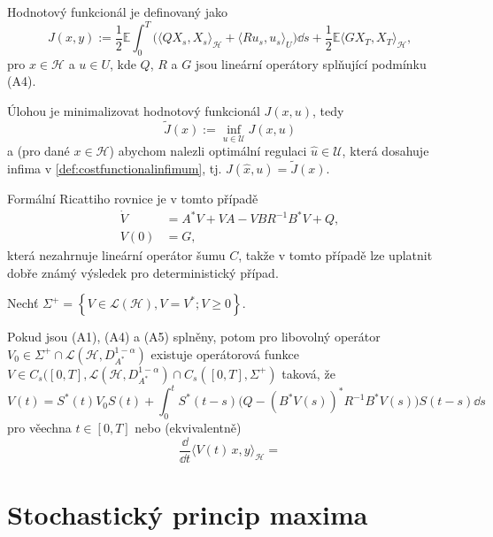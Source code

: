 Hodnotový funkcionál je definovaný jako
\begin{equation}
    J (x,y) := \frac{1}{2}\mathbb{E}\int_0^T \big( \langle Q X_s,
    X_s \rangle_\mathscr{H} + \langle R u_s, u_s\rangle_U \big) \dd s +
    \frac{1}{2} \mathbb{E} \langle G X_T, X_T \rangle_\mathscr{H},
    \label{def:costfunctional}
\end{equation}
pro $x\in\mathscr{H}$ a $u\in U$, kde $Q$, $R$ a $G$ jsou lineární
operátory splňující podmínku (A4).

Úlohou je minimalizovat hodnotový funkcionál $J(x,u)$, tedy
\begin{equation}
    \tilde{J}(x) := \inf_{u\in\mathscr{U}} J(x,u)
    \label{def:costfunctionalinfimum}
\end{equation}
a (pro dané $x\in\mathscr{H}$) abychom nalezli optimální regulaci
$\hat{u}\in\mathscr{U}$, která dosahuje infima v
\eqref{def:costfunctionalinfimum}, tj. $J(\hat{x},u) = \tilde{J}(x)$.

Formální Ricattiho rovnice je v tomto případě
\begin{align}
	\dot{V} &= A^*V + VA - VBR^{-1}B^{*}V + Q,\\
	V(0) &= G,
	\label{}
\end{align}
která nezahrnuje lineární operátor šumu $C$, takže v tomto případě lze uplatnit 
dobře známý výsledek pro deterministický případ.

Nechť $\Sigma^+ = \left\{ V\in\mathscr{L}(\mathscr{H}),V=V^*;V\geq0 \right\}$.

\begin{veta}
	Pokud jsou (A1), (A4) a (A5) splněny, potom pro libovolný operátor $V_0\in\Sigma^+\cap
	\mathscr{L}(\mathscr{H}, D_{A^*}^{1-\alpha})$ existuje operátorová funkce 
	$V\in C_s([0,T],\mathscr{L}(\mathscr{H}, D_{A^*}^{1-\alpha})\cap C_s([0,T],\Sigma^+)$
	taková, že
	\begin{equation}
		V(t) = S^*(t) V_0 S(t) + \int_0^t S^*(t-s)\big(Q-\left( B^*V(s) \right)^* R^{-1}B^*V(s)
		\big) S(t-s) \dd s
		\label{}
	\end{equation}
	pro věechna $t\in[0,T]$ nebo (ekvivalentně)
	\begin{equation}
		\frac{\dd}{\dd t} \langle V(t)\,x,y\rangle_\mathscr{H} = 
		\label{}
	\end{equation}
\end{veta}


\section{Stochastický princip maxima}
